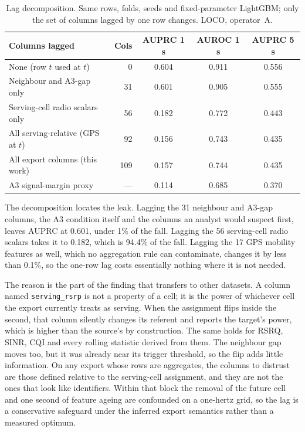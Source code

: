 \documentclass[preprint,review,12pt]{elsarticle}\usepackage{lineno}\linenumbers
\begin{document}
\begin{table}[t]
\centering
\caption{Lag decomposition. Same rows, folds, seeds and fixed-parameter LightGBM; only the set of columns lagged by one row changes. LOCO, operator~A.}
\label{tab:cost}
\footnotesize
\setlength{\tabcolsep}{3pt}
\begin{tabularx}{\linewidth}{X r c c c}
\toprule
\textbf{Columns lagged} & \textbf{Cols} & \textbf{AUPRC 1 s} & \textbf{AUROC 1 s} & \textbf{AUPRC 5 s} \\
\midrule
None (row $t$ used at $t$) & 0 & 0.604 & 0.911 & 0.556 \\
Neighbour and A3-gap only & 31 & 0.601 & 0.905 & 0.555 \\
Serving-cell radio scalars only & 56 & 0.182 & 0.772 & 0.443 \\
All serving-relative (GPS at $t$) & 92 & 0.156 & 0.743 & 0.435 \\
All export columns (this work) & 109 & 0.157 & 0.744 & 0.435 \\
\midrule
A3 signal-margin proxy & --- & 0.114 & 0.685 & 0.370 \\
\bottomrule
\end{tabularx}
\end{table}

The decomposition locates the leak. Lagging the 31 neighbour and A3-gap columns, the A3 condition itself and the columns an analyst would suspect first, leaves AUPRC at 0.601, under 1\% of the fall. Lagging the 56 serving-cell radio scalars takes it to 0.182, which is 94.4\% of the fall. Lagging the 17 GPS mobility features as well, which no aggregation rule can contaminate, changes it by less than 0.1\%, so the one-row lag costs essentially nothing where it is not needed.

The reason is the part of the finding that transfers to other datasets. A column named \texttt{serving\_rsrp} is not a property of a cell; it is the power of whichever cell the export currently treats as serving. When the assignment flips inside the second, that column silently changes its referent and reports the target's power, which is higher than the source's by construction. The same holds for RSRQ, SINR, CQI and every rolling statistic derived from them. The neighbour gap moves too, but it was already near its trigger threshold, so the flip adds little information. On any export whose rows are aggregates, the columns to distrust are those defined relative to the serving-cell assignment, and they are not the ones that look like identifiers. Within that block the removal of the future cell and one second of feature ageing are confounded on a one-hertz grid, so the lag is a conservative safeguard under the inferred export semantics rather than a measured optimum.
\end{document}
